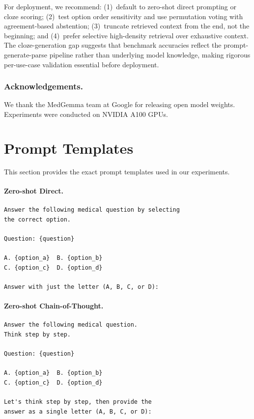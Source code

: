 \documentclass[runningheads,a4paper]{llncs}
\begin{document}
For deployment, we recommend: (1)~default to zero-shot direct prompting or cloze scoring; (2)~test option order sensitivity and use permutation voting with agreement-based abstention; (3)~truncate retrieved context from the end, not the beginning; and (4)~prefer selective high-density retrieval over exhaustive context. The cloze-generation gap suggests that benchmark accuracies reflect the prompt-generate-parse pipeline rather than underlying model knowledge, making rigorous per-use-case validation essential before deployment.

\subsubsection{Acknowledgements.}
We thank the MedGemma team at Google for releasing open model weights. Experiments were conducted on NVIDIA A100 GPUs.




\appendix

\section{Prompt Templates}\label{app:prompts}

This section provides the exact prompt templates used in our experiments.

\paragraph{Zero-shot Direct.}
\begin{verbatim}
Answer the following medical question by selecting
the correct option.

Question: {question}

A. {option_a}  B. {option_b}
C. {option_c}  D. {option_d}

Answer with just the letter (A, B, C, or D):
\end{verbatim}

\paragraph{Zero-shot Chain-of-Thought.}
\begin{verbatim}
Answer the following medical question.
Think step by step.

Question: {question}

A. {option_a}  B. {option_b}
C. {option_c}  D. {option_d}

Let's think step by step, then provide the
answer as a single letter (A, B, C, or D):
\end{verbatim}
\end{document}
